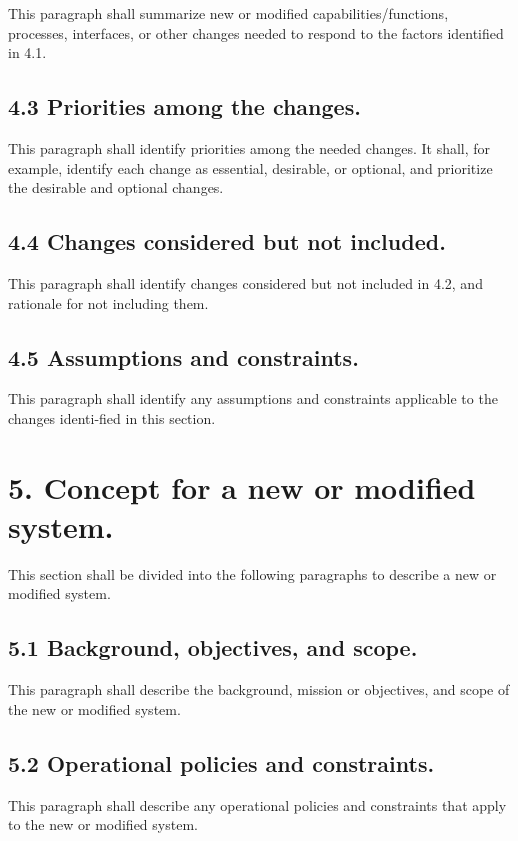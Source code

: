 This paragraph shall summarize new or modified capabilities/functions,
processes, interfaces, or other changes needed to respond to the factors
identified in 4.1.

\subsection{4.3 Priorities among the changes.}

This paragraph shall identify priorities among the needed changes. It
shall, for example, identify each change as essential, desirable, or
optional, and prioritize the desirable and optional changes.

\subsection{4.4 Changes considered but not included.}

This paragraph shall identify changes considered but not included in
4.2, and rationale for not including them.

\subsection{4.5 Assumptions and constraints.}

This paragraph shall identify any assumptions and constraints applicable
to the changes identi-fied in this section.

\section{5. Concept for a new or modified system.}

This section shall be divided into the following paragraphs to describe
a new or modified system.

\subsection{5.1 Background, objectives, and scope.}

This paragraph shall describe the background, mission or objectives, and
scope of the new or modified system.

\subsection{5.2 Operational policies and constraints.}

This paragraph shall describe any operational policies and constraints
that apply to the new or modified system.

